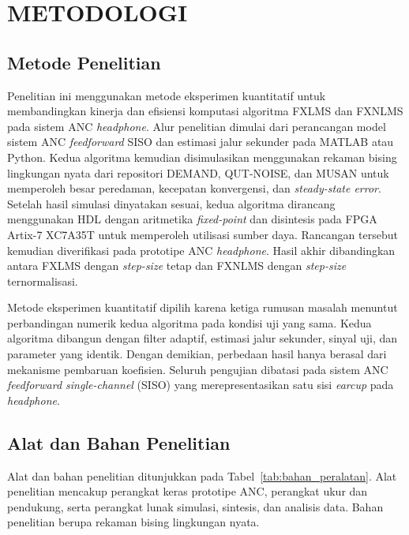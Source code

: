 \chapter{METODOLOGI}
\label{chap:metodologi}

\section{Metode Penelitian}
\label{sec:metode}

Penelitian ini menggunakan metode eksperimen kuantitatif untuk membandingkan kinerja dan efisiensi komputasi algoritma FXLMS dan FXNLMS pada sistem ANC \emph{headphone}. Alur penelitian dimulai dari perancangan model sistem ANC \emph{feedforward} SISO dan estimasi jalur sekunder pada MATLAB atau Python. Kedua algoritma kemudian disimulasikan menggunakan rekaman bising lingkungan nyata dari repositori DEMAND, QUT-NOISE, dan MUSAN untuk memperoleh besar peredaman, kecepatan konvergensi, dan \emph{steady-state error}. Setelah hasil simulasi dinyatakan sesuai, kedua algoritma dirancang menggunakan HDL dengan aritmetika \emph{fixed-point} dan disintesis pada FPGA Artix-7 XC7A35T untuk memperoleh utilisasi sumber daya. Rancangan tersebut kemudian diverifikasi pada prototipe ANC \emph{headphone}. Hasil akhir dibandingkan antara FXLMS dengan \emph{step-size} tetap dan FXNLMS dengan \emph{step-size} ternormalisasi.

Metode eksperimen kuantitatif dipilih karena ketiga rumusan masalah menuntut perbandingan numerik kedua algoritma pada kondisi uji yang sama. Kedua algoritma dibangun dengan filter adaptif, estimasi jalur sekunder, sinyal uji, dan parameter yang identik. Dengan demikian, perbedaan hasil hanya berasal dari mekanisme pembaruan koefisien. Seluruh pengujian dibatasi pada sistem ANC \emph{feedforward single-channel} (SISO) yang merepresentasikan satu sisi \emph{earcup} pada \emph{headphone}.

\section{Alat dan Bahan Penelitian}
\label{sec:bahan_dan_peralatan}

Alat dan bahan penelitian ditunjukkan pada Tabel~\ref{tab:bahan_peralatan}. Alat penelitian mencakup perangkat keras prototipe ANC, perangkat ukur dan pendukung, serta perangkat lunak simulasi, sintesis, dan analisis data. Bahan penelitian berupa rekaman bising lingkungan nyata.

